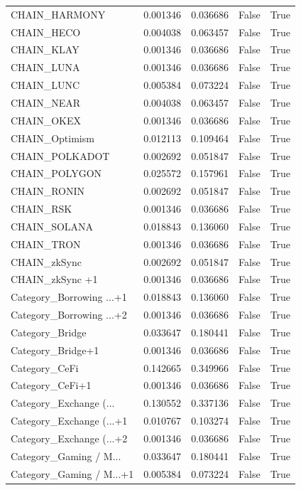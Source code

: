 \begin{tabular}{lllll}
CHAIN\_HARMONY  & 0.001346 & 0.036686 & False & True \\
CHAIN\_HECO  & 0.004038 & 0.063457 & False & True \\
CHAIN\_KLAY  & 0.001346 & 0.036686 & False & True \\
CHAIN\_LUNA  & 0.001346 & 0.036686 & False & True \\
CHAIN\_LUNC  & 0.005384 & 0.073224 & False & True \\
CHAIN\_NEAR  & 0.004038 & 0.063457 & False & True \\
CHAIN\_OKEX  & 0.001346 & 0.036686 & False & True \\
CHAIN\_Optimism  & 0.012113 & 0.109464 & False & True \\
CHAIN\_POLKADOT  & 0.002692 & 0.051847 & False & True \\
CHAIN\_POLYGON  & 0.025572 & 0.157961 & False & True \\
CHAIN\_RONIN  & 0.002692 & 0.051847 & False & True \\
CHAIN\_RSK  & 0.001346 & 0.036686 & False & True \\
CHAIN\_SOLANA  & 0.018843 & 0.136060 & False & True \\
CHAIN\_TRON  & 0.001346 & 0.036686 & False & True \\
CHAIN\_zkSync  & 0.002692 & 0.051847 & False & True \\
CHAIN\_zkSync +1 & 0.001346 & 0.036686 & False & True \\
Category\_Borrowing ...+1 & 0.018843 & 0.136060 & False & True \\
Category\_Borrowing ...+2 & 0.001346 & 0.036686 & False & True \\
Category\_Bridge & 0.033647 & 0.180441 & False & True \\
Category\_Bridge+1 & 0.001346 & 0.036686 & False & True \\
Category\_CeFi & 0.142665 & 0.349966 & False & True \\
Category\_CeFi+1 & 0.001346 & 0.036686 & False & True \\
Category\_Exchange (... & 0.130552 & 0.337136 & False & True \\
Category\_Exchange (...+1 & 0.010767 & 0.103274 & False & True \\
Category\_Exchange (...+2 & 0.001346 & 0.036686 & False & True \\
Category\_Gaming / M... & 0.033647 & 0.180441 & False & True \\
Category\_Gaming / M...+1 & 0.005384 & 0.073224 & False & True \\

\end{tabular}
